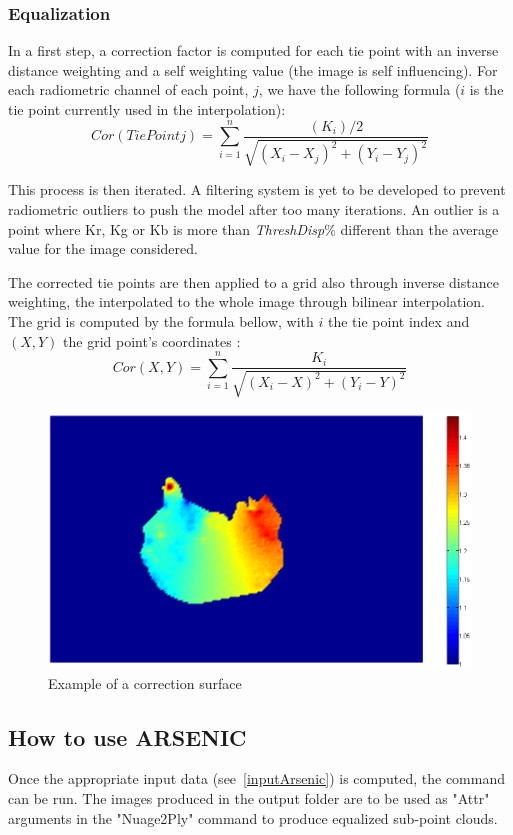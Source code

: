 \subsubsection{Equalization}

In a first step, a correction factor is computed for each tie point with an inverse distance weighting and a self weighting value (the image is self influencing). For each radiometric channel of each point, $j$, we have the following formula ($i$ is the tie point currently used in the interpolation): 
\[Cor(TiePointj)=\sum_{i=1}^{n} \frac{(K_{i})/2}{\sqrt{(X_{i}-X_{j})^2+(Y_{i}-Y_{j})^2}}\]

This process is then iterated. A filtering system is yet to be developed to prevent radiometric outliers to push the model after too many iterations. An outlier is a point where Kr, Kg or Kb is more than \textit{ThreshDisp}\% different than the average value for the image considered.


The corrected tie points are then applied to a grid also through inverse distance weighting, the interpolated to the whole image through bilinear interpolation. The grid is computed by the formula bellow, with $i$ the tie point index and $(X,Y)$ the grid point's coordinates : \[Cor(X,Y)=\sum_{i=1}^{n} \frac{K_{i}}{\sqrt{(X_{i}-X)^2+(Y_{i}-Y)^2}}\]

\begin{figure}[H]
\centering
\includegraphics[width=15cm]{FIGS/Arsenic/SurfCorr.png}
\caption{Example of a correction surface}
\label{SurfCorr}
\end{figure}


\subsection{How to use ARSENIC}

Once the appropriate input data (see~\ref{inputArsenic}) is computed, the command can be run. The images produced in the output folder are to be used as "Attr" arguments in the "Nuage2Ply" command to produce equalized sub-point clouds.



